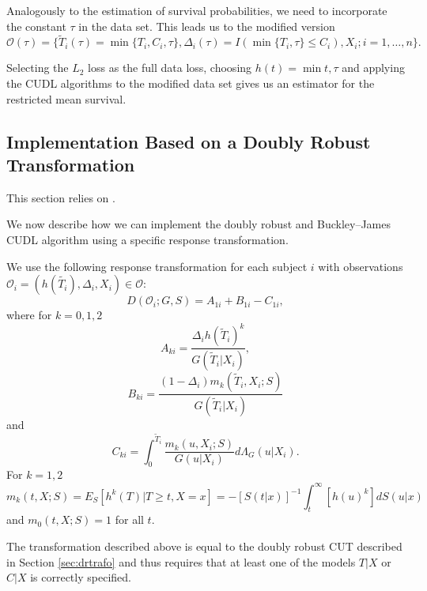 \documentclass[12pt, a4paper]{scrartcl}
\theoremstyle{definition}
\theoremstyle{plain}
\numberwithin{equation}{section}
\numberwithin{figure}{section}
\numberwithin{table}{section}
\begin{document}
	Analogously to the estimation of survival probabilities, we need to incorporate the constant $\tau$ in the data set.
	This leads us to the modified version	
	\begin{equation*}
		\mathcal{O}(\tau) = \{\tilde{T}_i(\tau) = \min\{T_i, C_i, \tau\}, \Delta_i(\tau) = I(\min\{T_i, \tau\}\leq C_i), X_i; i = 1, \dots , n\}.
	\end{equation*}
	
	Selecting the $L_2$ loss as the full data loss, choosing $h(t) = \min{t,\tau}$ and applying the CUDL algorithms to the modified data set gives us an estimator for the restricted mean survival.
	
	\subsection{Implementation Based on a Doubly Robust Transformation}\label{trafo}

	This section relies on \citet*{basearticle}.
	
	We now describe how we can implement the doubly robust and Buckley--James CUDL algorithm using a specific response transformation.
	
	We use the following response transformation for each subject $i$ with observations $\mathcal{O}_i = (h(\tilde{T_i}), \Delta_i, X_i) \in \mathcal{O}$:
	\begin{equation*}
	D(\mathcal O_i; G,S) = A_{1i}+B_{1i} - C_{1i},
	\end{equation*}
	where for $k=0,1,2$
	\begin{equation*}
	A_{ki} = \frac{\Delta_i h(\tilde{T}_i)^k}{G(\tilde{T}_i\vert X_i)},
	\end{equation*}
	\begin{equation*}
	B_{ki} = \frac{(1-\Delta_i)m_k(\tilde{T}_i, X_i; S)}{G(\tilde{T}_i\vert X_i)}
	\end{equation*}
	and
	\begin{equation*}
	C_{ki} = \int_{0}^{\tilde{T}_i} \frac{m_k(u, X_i; S)}{G(u \vert X_i)}d\Lambda_G(u \vert X_i).
	\end{equation*}
	For $k=1,2$
	\begin{equation}\label{eq:condexp}
	m_k(t,X;S) = E_S[h^k(T) \vert T \geq t, X = x] = -[S(t\vert x)]^{-1} \int_{t}^{\infty}[h(u)^k]dS(u\vert x)
	\end{equation}
	and $m_0(t,X;S) = 1$ for all $t$.
	
	The transformation described above is equal to the doubly robust CUT described in Section \ref{sec:drtrafo} and thus requires that at least one of the models $T\vert X$ or $C \vert X$ is correctly specified.
	
\end{document}
